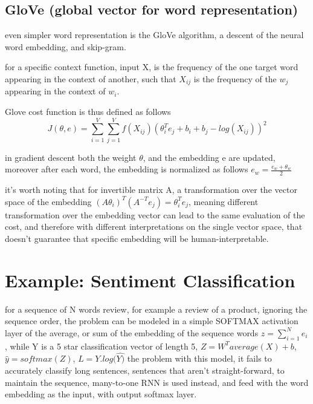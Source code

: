 \documentclass[4apaper,12pt]{book}
\begin{document}
\begin{description}
\begin{description}
\begin{description}
            \subsection{GloVe (global vector for word representation)}
            \begin{description}
            \item even simpler word representation is the GloVe algorithm, a descent of the neural word embedding, and skip-gram.
            \item for a specific context function, input X, is the frequency of the one target word appearing in the context of another, such that $X_{ij}$ is the frequency of the $w_j$ appearing in the context of $w_i$.
            \item Glove cost function is thus defined as follows $$ J(\theta, e) = \sum_{i=1}^V\sum_{j=1}^Vf(X_{ij})(\theta_i^Te_j + b_i + b_j - log(X_{ij}))^2 $$
            \item in gradient descent both the weight $\theta$, and the embedding e are updated, moreover after each word, the embedding is normalized as follows $e_w=\frac{e_w+\theta_w}{2}$
            \item it's worth noting that for invertible matrix A, a transformation over the vector space of the embedding $(A\theta_i)^T(A^{-T}e_j)=\theta_i^Te_j$, meaning different transformation over the embedding vector can lead to the same evaluation of the cost, and therefore with different interpretations on the single vector space, that doesn't guarantee that specific embedding will be human-interpretable.
            \end{description}
        \end{description}
    \end{description}
    \section{Example: Sentiment Classification}
    \begin{description}
    \item for a sequence of N words review, for example a review of a product, ignoring the sequence order, the problem can be modeled in a simple SOFTMAX activation layer of the average, or sum of the embedding of the sequence words $ z = \sum_{i=1}^Ne_i $, while Y is a 5 star classification vector of length 5, $Z=W^Taverage(X) + b$, $\hat{y} = softmax(Z)$, $L=Y.log(\hat{Y)}$ the problem with this model, it fails to accurately classify long sentences, sentences that aren't straight-forward, to maintain the sequence, many-to-one RNN is used instead, and feed with the word embedding as the input,  with output softmax layer.
    \end{description}

\end{description}
\end{document}
